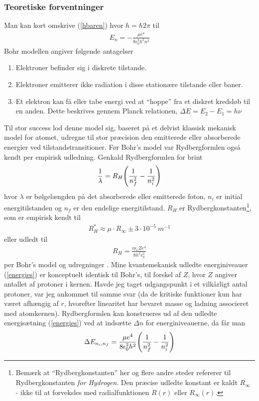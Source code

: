 \documentclass[12pt]{article}
\newcommand{\s}[1]{~\si{#1}}
\theoremstyle{definition}
\theoremstyle{remark}
\theoremstyle{definition}
\numberwithin{equation}{section}
\begin{document}
\subsubsection{Teoretiske forventninger}    
Man kan kort omskrive (\ref{hbaren}) hvor $h=\hbar 2\pi$ til
\begin{align}
\label{energies}
    E_n=-\frac{\mu e^4}{8\epsilon_0^2h^2n^2}
\end{align}
Bohr modellen angiver følgende antagelser
\begin{enumerate}
    \item Elektroner befinder sig i diskrete tilstande.
    \item Elektroner emitterer ikke radiation i disse stationære tilstande eller baner.
    \item Et elektron kan få eller tabe energi ved at ``hoppe'' fra et diskret kredsløb til en anden. Dette beskrives gennem Planck relationen, $\displaystyle \Delta E = E_2 - E_1 = h\nu $
\end{enumerate}
Til stor success lod denne model sig, baseret på et delvist klassisk mekanisk model for atomet, udregne til stor præcision den emitterede eller absorberede energier ved tilstandstransitioner. Før Bohr's model var Rydbergformlen også kendt per empirisk udledning. Genkald Rydbergformlen for brint
\begin{align}
    \frac{1}{\lambda} = R_H\qty(\frac{1}{n^2_f}-\frac{1}{n^2_i})
\end{align}
hvor $\lambda$ er bølgelængden på det absorberede eller emitterede foton, $n_i$ er initial energitilstanden og $n_f$ er den endelige energitilstand. $R_H$ er Rydbergkonstanten\footnote{Bemærk at ``Rydbergkonstanten'' her og flere andre steder refererer til Rydbergkonstanten \textit{for Hydrogen}. Den præcise udledte konstant er kaldt $R_\infty$ - ikke til at forveksles med radialfunktionen $R(r)$ eller $R_{\infty}(r)$.}, som er empirisk kendt til 
\begin{align}
    R_H^* \approx \mu \cdot R_{\infty}\pm 3\cdot 10^{-5} \s{m^{-1}}
\end{align}
eller udledt til
\begin{align}
    R_H = \frac{m_e Ze^4}{8h^2\epsilon_0^2}
\end{align}
per Bohr's model og udregninger \parencite{bohr}. Mine kvantemekanisk udledte energiniveauer (\ref{energies}) er konceptuelt identisk til Bohr's, til forskel af $Z$, hvor $Z$ angiver antallet af protoner i kernen. Havde jeg taget udgangspunkt i et vilkårligt antal protoner, var jeg ankommet til samme svar (da de kritiske funktioner kun har været afhængig af $r$, hvorefter linearitet har bevaret masse og ladning associeret med atomkernen). Rydbergformlen kan konstrueres ud af den udledte energisætning (\ref{energies}) ved at indsætte $\Delta n$ for energiniveauerne, da får man
\begin{align}
\label{rydb}
    \Delta E_{n_i,n_f} = \frac{\mu e^4}{8\epsilon_0^2h^2}\qty(\frac{1}{n^2_f}-\frac{1}{n^2_i})
\end{align}
\end{document}
